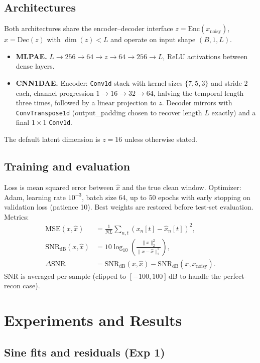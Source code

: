 \documentclass[11pt]{article}
\begin{document}
\subsection{Architectures}\label{sec:arch}
Both architectures share the encoder--decoder interface $z = \mathrm{Enc}(x_{\text{noisy}})$, $\hat{x} = \mathrm{Dec}(z)$ with $\dim(z) < L$ and operate on input shape $(B, 1, L)$.
\begin{itemize}
  \item \textbf{MLPAE.} $L \to 256 \to 64 \to z \to 64 \to 256 \to L$, ReLU activations between dense layers.
  \item \textbf{CNN1DAE.} Encoder: \texttt{Conv1d} stack with kernel sizes $\{7,5,3\}$ and stride $2$ each, channel progression $1\to 16\to 32\to 64$, halving the temporal length three times, followed by a linear projection to $z$. Decoder mirrors with \texttt{ConvTranspose1d} (output\_padding chosen to recover length $L$ exactly) and a final $1\!\times\!1$ \texttt{Conv1d}.
\end{itemize}
The default latent dimension is $z = 16$ unless otherwise stated.

\subsection{Training and evaluation}
Loss is mean squared error between $\hat{x}$ and the true clean window. Optimizer: Adam, learning rate $10^{-3}$, batch size 64, up to 50 epochs with early stopping on validation loss (patience 10). Best weights are restored before test-set evaluation. Metrics:
\begin{align}
\mathrm{MSE}(x, \hat{x}) &= \tfrac{1}{NL}\sum_{n,t} (x_n[t] - \hat{x}_n[t])^2, \\
\mathrm{SNR}_{\mathrm{dB}}(x, \hat{x}) &= 10 \log_{10}\!\left(\frac{\|x\|_2^2}{\|x - \hat{x}\|_2^2}\right), \\
\Delta\mathrm{SNR} &= \mathrm{SNR}_{\mathrm{dB}}(x, \hat{x}) - \mathrm{SNR}_{\mathrm{dB}}(x, x_{\text{noisy}}).
\end{align}
SNR is averaged per-sample (clipped to $[-100, 100]$\,dB to handle the perfect-recon case).

\section{Experiments and Results}\label{sec:results}

\subsection{Sine fits and residuals (Exp 1)}\label{sec:results-fit}
\end{document}
